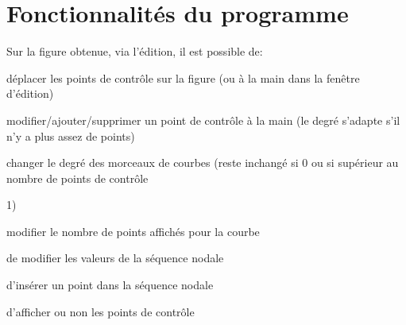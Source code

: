 
\section{Fonctionnalités du programme}

Sur la figure obtenue, via l'édition, il est possible de:
 
\item déplacer les points de contrôle sur la figure (ou à la main dans la fenêtre d'édition)
\item modifier/ajouter/supprimer un point de contrôle à la main (le degré s'adapte s'il n'y a plus assez de points)
\item changer le degré des morceaux de courbes (reste inchangé si 0 ou si supérieur au nombre de points de contrôle \item 1)
\item modifier le nombre de points affichés pour la courbe
\item de modifier les valeurs de la séquence nodale %
\item d'insérer un point dans la séquence nodale
\item d'afficher ou non les points de contrôle




